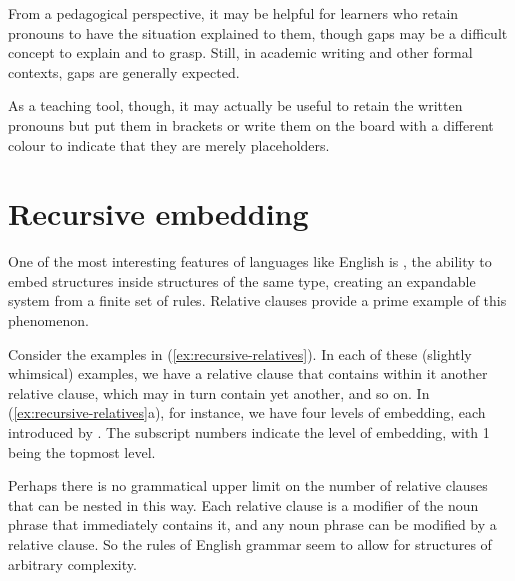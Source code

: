 From a pedagogical perspective, it may be helpful for learners who retain pronouns to have the situation explained to them, though gaps may be a difficult concept to explain and to grasp. Still, in academic writing and other formal contexts, gaps are generally expected.

As a teaching tool, though, it may actually be useful to retain the written pronouns but put them in brackets or write them on the board with a different colour to indicate that they are merely placeholders.

\section{Recursive embedding}

One of the most interesting features of languages like English is , the ability to embed structures inside structures of the same type, creating an expandable system from a finite set of rules. Relative clauses provide a prime example of this phenomenon.

Consider the examples in (\ref{ex:recursive-relatives}).
\ea \label{ex:recursive-relatives}
    \z
\z
In each of these (slightly whimsical) examples, we have a relative clause that contains within it another relative clause, which may in turn contain yet another, and so on. In (\ref{ex:recursive-relatives}a), for instance, we have four levels of embedding, each introduced by . The subscript numbers indicate the level of embedding, with 1 being the topmost level.

Perhaps there is no grammatical upper limit on the number of relative clauses that can be nested in this way. Each relative clause is a modifier of the noun phrase that immediately contains it, and any noun phrase can be modified by a relative clause. So the rules of English grammar seem to allow for structures of arbitrary complexity.

